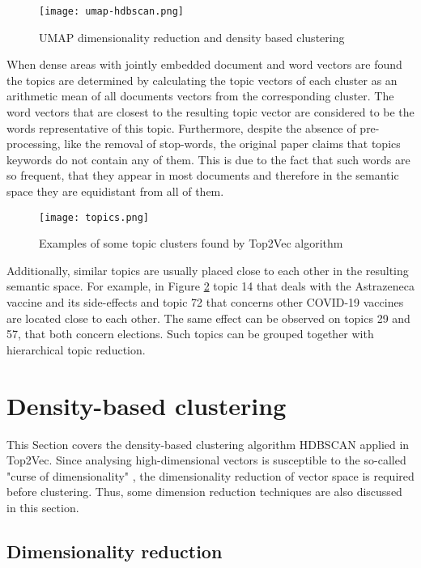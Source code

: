 \documentclass[fontsize=12pt,a4paper,twoside,openany]{scrbook}
\begin{document}
\begin{figure}[h]
\centering
\texttt{[image: umap-hdbscan.png]}
\caption{UMAP dimensionality reduction and density based clustering \parencite[see also][]{Angelov20}}
\label{fig:umap-hdbscan}
\end{figure}

When dense areas with jointly embedded document and word vectors are found the topics are determined by calculating the topic vectors of each cluster as an arithmetic mean of all documents vectors from the corresponding cluster. The word vectors that are closest to the resulting topic vector are considered to be the words representative of this topic. Furthermore, despite the absence of pre-processing, like the removal of stop-words, the original paper claims that topics keywords do not contain any of them. This is due to the fact that such words are so frequent, that they appear in most documents and therefore in the semantic space they are equidistant from all of them.

\begin{figure}[h]
\centering
\texttt{[image: topics.png]}
\caption{Examples of some topic clusters found by Top2Vec algorithm}
\label{fig:topics}
\end{figure}

Additionally, similar topics are usually placed close to each other in the resulting semantic space. For example, in Figure \ref{fig:topics} topic 14 that deals with the Astrazeneca vaccine and its side-effects and topic 72 that concerns other COVID-19 vaccines are located close to each other. The same effect can be observed on topics 29 and 57, that both concern elections. Such topics can be grouped together with hierarchical topic reduction.


\section{Density-based clustering}
\label{sec:C}

This Section covers the density-based clustering algorithm HDBSCAN applied in Top2Vec. Since analysing high-dimensional vectors is susceptible to the so-called "curse of dimensionality" \parencite{Theodoridis08}, the dimensionality reduction of vector space is required before clustering. Thus, some dimension reduction techniques are also discussed in this section.

\subsection{Dimensionality reduction}
\label{sec:umap}
\end{document}
